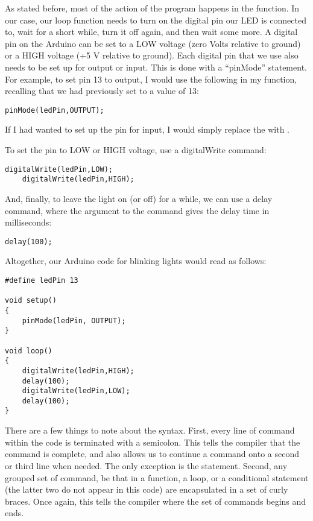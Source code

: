As stated before, most of the action of the program happens in the
 function. In our case, our loop function needs to turn on
the digital pin our LED is connected to, wait for a short while, turn it off
again, and then wait some more.
A digital pin on the Arduino can be set to a LOW voltage (zero Volts relative
to ground) or a HIGH voltage (+5 V relative to ground). Each digital pin that
we use also needs to be set up for output or input. This is done with a 
``pinMode'' statement. For example, to set pin 13 to output, I would use the 
following in my  function, recalling that we had previously
set  to a value of 13:
\begin{lstlisting}[language=Arduino] 
    pinMode(ledPin,OUTPUT);
\end{lstlisting}
If I had wanted to set up the pin for input, I would simply replace the
 with .

To set the pin to LOW or HIGH voltage, use a digitalWrite command:
\begin{lstlisting}[language=Arduino] 
    digitalWrite(ledPin,LOW);
    digitalWrite(ledPin,HIGH);
\end{lstlisting}
And, finally, to leave the light on (or off) for a while, we can use
a delay command, where the argument to the command gives the delay time in
milliseconds:
\begin{lstlisting}[language=Arduino] 
    delay(100);
\end{lstlisting}

Altogether, our Arduino code for blinking lights would read as follows:
\begin{lstlisting}[language=Arduino] 
#define ledPin 13

void setup() 
{
    pinMode(ledPin, OUTPUT);
}

void loop() 
{
    digitalWrite(ledPin,HIGH);
    delay(100);
    digitalWrite(ledPin,LOW);
    delay(100);
}
\end{lstlisting}
There are a few things to note about the syntax. First, every line of command
within the code is terminated with a semicolon. This tells the compiler that the
command is complete, and also allows us to continue a command onto a second
or third line when needed. The only exception is the  statement.
Second, any grouped set of command, be that in a function, a loop, or a 
conditional statement (the latter two do not appear in this code) are 
encapsulated in a set of curly braces. Once again, this tells the compiler 
where the set of commands begins and ends.

